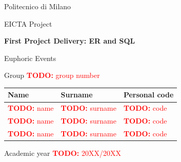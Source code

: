 \documentclass[11pt,a4paper]{report}
\newcommand{\todo}[1]{\textcolor{red}{\textbf{TODO:} #1}}
\begin{document}
\begin{titlepage}
  \centering
  {\Large Politecnico di Milano\par}
  \vspace{0.5cm}
  {\large EICTA \textendash{} Project\par}
  \vspace{2.5cm}
  {\Huge\bfseries First Project Delivery: ER and SQL\par}
  \vspace{0.6cm}
  {\Large Euphoric Events\par}
  \vspace{2cm}
  {\large Group \todo{group number}\par}
  \vspace{1cm}
  \begin{tabular}{lll}
    \toprule
    Name & Surname & Personal code \\
    \midrule
    \todo{name} & \todo{surname} & \todo{code} \\
    \todo{name} & \todo{surname} & \todo{code} \\
    \todo{name} & \todo{surname} & \todo{code} \\
    \bottomrule
  \end{tabular}
  \vfill
  {\large Academic year \todo{20XX/20XX}\par}
\end{titlepage}

\tableofcontents








\end{document}
